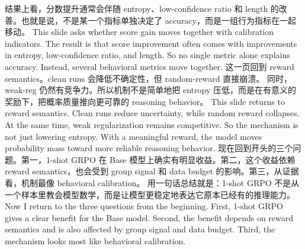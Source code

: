 {}结果上看，分数提升通常会伴随 entropy、low-confidence ratio 和 length 的改善。也就是说，不是某一个指标单独决定了 accuracy，而是一组行为指标在一起移动。\markdownRendererInterblockSeparator
{}\markdownRendererInterblockSeparator
{}This slide asks whether score gain moves together with calibration indicators.\markdownRendererInterblockSeparator
{}The result is that score improvement often comes with improvements in entropy, low-confidence ratio, and length. So no single metric alone explains accuracy. Instead, several behavioral metrics move together.\markdownRendererInterblockSeparator
{}\markdownRendererHorizontalRule{}\markdownRendererInterblockSeparator
{}\markdownRendererInterblockSeparator
{}\markdownRendererInterblockSeparator
{}这一页回到 reward semantics。clean runs 会降低不确定性，但 random-reward 直接崩溃。\markdownRendererInterblockSeparator
{}同时，weak-reg 仍然有竞争力。所以机制不是简单地把 entropy 压低，而是在有意义的奖励下，把概率质量推向更可靠的 reasoning behavior。\markdownRendererInterblockSeparator
{}\markdownRendererInterblockSeparator
{}This slide returns to reward semantics. Clean runs reduce uncertainty, while random reward collapses.\markdownRendererInterblockSeparator
{}At the same time, weak regularization remains competitive. So the mechanism is not just lowering entropy. With a meaningful reward, the model moves probability mass toward more reliable reasoning behavior.\markdownRendererInterblockSeparator
{}\markdownRendererHorizontalRule{}\markdownRendererInterblockSeparator
{}\markdownRendererInterblockSeparator
{}\markdownRendererInterblockSeparator
{}现在回到开头的三个问题。第一，1-shot GRPO 在 Base 模型上确实有明显收益。第二，这个收益依赖 reward semantics，也会受到 group signal 和 data budget 的影响。第三，从证据看，机制最像 behavioral calibration。\markdownRendererInterblockSeparator
{}用一句话总结就是：1-shot GRPO 不是从一个样本里教会模型数学，而是让模型更稳定地表达它原本已经有的推理能力。\markdownRendererInterblockSeparator
{}\markdownRendererInterblockSeparator
{}Now I return to the three questions from the beginning. First, 1-shot GRPO gives a clear benefit for the Base model. Second, the benefit depends on reward semantics and is also affected by group signal and data budget. Third, the mechanism looks most like behavioral calibration.\markdownRendererInterblockSeparator
